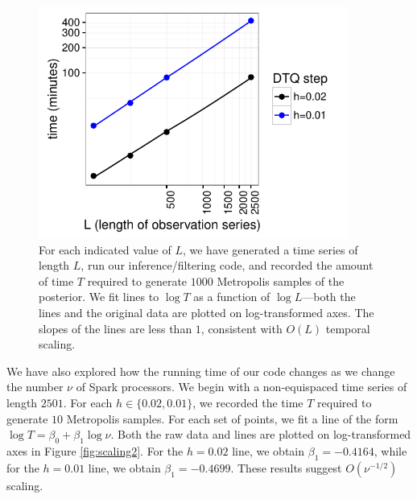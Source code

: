 \documentclass[wcp]{jmlr}
\begin{document}
\begin{figure}[th]
\begin{center}
\includegraphics[width=4in]{scaling}
\end{center}
\vspace{-0.25in}
\caption{For each indicated value of $L$, we have generated a time
  series of length $L$, run our inference/filtering code, and recorded
  the amount of time $T$ required to generate $1000$ Metropolis samples of
  the posterior.  We fit lines to $\log T$ as a function of $\log
  L$---both the lines and the original data are plotted on
  log-transformed axes.  The slopes of the lines are less than $1$,
  consistent with $O(L)$ temporal scaling.}
\label{fig:scaling}
\end{figure}

We have also explored how the running time of our code changes as we
change the number $\nu$ of Spark processors.  We begin with a non-equispaced
time series of length $2501$.  For each $h \in \{0.02,0.01\}$, we
recorded the time $T$ required to 
generate $10$ Metropolis samples.  For each set of points, we fit a
line of the form $\log T = \beta_0 + \beta_1 \log \nu$.  Both the raw
data and lines are plotted on log-transformed axes in Figure \ref{fig:scaling2}.  For the
$h=0.02$ line, we obtain $\beta_1=-0.4164$, while for the $h=0.01$
line, we obtain $\beta_1=-0.4699$.  These results suggest $O(\nu^{-1/2})$ scaling.
\end{document}

